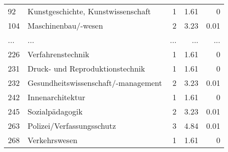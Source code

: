 \begin{longtable}{lXrrr}
        92 & \multicolumn{1}{X}{Kunstgeschichte, Kunstwissenschaft} & %
          \num{1} &
          \num[round-mode=places,round-precision=2]{1.61} &
          \num[round-mode=places,round-precision=2]{0} \\
        104 & \multicolumn{1}{X}{Maschinenbau/-wesen} & %
          \num{2} &
          \num[round-mode=places,round-precision=2]{3.23} &
          \num[round-mode=places,round-precision=2]{0.01} \\
       ... & ... & ... & ... & ... \\
        226 & \multicolumn{1}{X}{Verfahrenstechnik} & %
          \num{1} &
          \num[round-mode=places,round-precision=2]{1.61} &
          \num[round-mode=places,round-precision=2]{0} \\

        231 & \multicolumn{1}{X}{Druck- und Reproduktionstechnik} & %
          \num{1} &
          \num[round-mode=places,round-precision=2]{1.61} &
          \num[round-mode=places,round-precision=2]{0} \\

        232 & \multicolumn{1}{X}{Gesundheitswissenschaft/-management} & %
          \num{2} &
          \num[round-mode=places,round-precision=2]{3.23} &
          \num[round-mode=places,round-precision=2]{0.01} \\

        242 & \multicolumn{1}{X}{Innenarchitektur} & %
          \num{1} &
          \num[round-mode=places,round-precision=2]{1.61} &
          \num[round-mode=places,round-precision=2]{0} \\

        245 & \multicolumn{1}{X}{Sozialpädagogik} & %
          \num{2} &
          \num[round-mode=places,round-precision=2]{3.23} &
          \num[round-mode=places,round-precision=2]{0.01} \\

        263 & \multicolumn{1}{X}{Polizei/Verfassungsschutz} & %
          \num{3} &
          \num[round-mode=places,round-precision=2]{4.84} &
          \num[round-mode=places,round-precision=2]{0.01} \\

        268 & \multicolumn{1}{X}{Verkehrswesen} & %
          \num{1} &
          \num[round-mode=places,round-precision=2]{1.61} &
          \num[round-mode=places,round-precision=2]{0} \\


\end{longtable}
